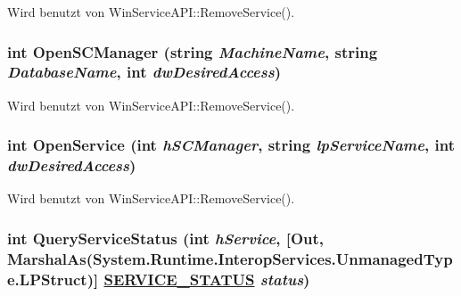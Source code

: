 Wird benutzt von Win\-Service\-API::Remove\-Service().\hypertarget{classQbeSAS_1_1WinServiceAPI_QbeSAS_1_1WinServiceAPId0}{
\subsubsection[OpenSCManager]{\setlength{\rightskip}{0pt plus 5cm}int Open\-SCManager (string {\em Machine\-Name}, string {\em Database\-Name}, int {\em dw\-Desired\-Access})}}
\label{classQbeSAS_1_1WinServiceAPI_QbeSAS_1_1WinServiceAPId0}




Wird benutzt von Win\-Service\-API::Remove\-Service().\hypertarget{classQbeSAS_1_1WinServiceAPI_QbeSAS_1_1WinServiceAPId1}{
\subsubsection[OpenService]{\setlength{\rightskip}{0pt plus 5cm}int Open\-Service (int {\em h\-SCManager}, string {\em lp\-Service\-Name}, int {\em dw\-Desired\-Access})}}
\label{classQbeSAS_1_1WinServiceAPI_QbeSAS_1_1WinServiceAPId1}




Wird benutzt von Win\-Service\-API::Remove\-Service().\hypertarget{classQbeSAS_1_1WinServiceAPI_QbeSAS_1_1WinServiceAPId3}{
\subsubsection[QueryServiceStatus]{\setlength{\rightskip}{0pt plus 5cm}int Query\-Service\-Status (int {\em h\-Service}, \mbox{[}Out, Marshal\-As(System.Runtime.Interop\-Services.Unmanaged\-Type.LPStruct)\mbox{]} \hyperlink{classQbeSAS_1_1WinServiceAPI_1_1SERVICE__STATUS}{SERVICE\_\-STATUS} {\em status})}}
\label{classQbeSAS_1_1WinServiceAPI_QbeSAS_1_1WinServiceAPId3}




